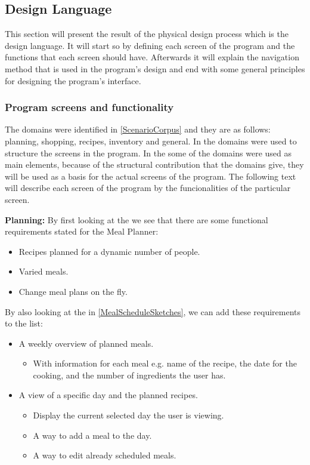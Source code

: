 \subsection{Design Language} \label{DesignLanguage}
This section will present the result of the physical design process which is the design language. It will start so by defining each screen of the program and the  functions that each screen should have. Afterwards it will explain the navigation method that is used in the program's design and end with some general principles for designing the program's interface.

\subsubsection{Program screens and functionality} \label{ScreensandFunctionality}
The domains were identified in \cref{ScenarioCorpus} and they are as follows: planning, shopping, recipes, inventory and general. In  the domains were used to structure the screens in the program. In the  some of the domains were used as main elements, because of the structural contribution that the domains give, they will be used as a basis for the actual screens of the program. The following text will describe each screen of the program by the funcionalities of the particular screen.

\textbf{Planning:}
By first looking at the  we see that there are some functional requirements stated for the Meal Planner:

\begin{itemize}
\item Recipes planned for a dynamic number of people.
\item Varied meals.
\item Change meal plans on the fly.
\end{itemize}  

By also looking at the  in \cref{MealScheduleSketches}, we can add these requirements to the list:

\begin{itemize}
	\item A weekly overview of planned meals.
		\begin{itemize}
			\item With information for each meal e.g. name of the recipe, the date for the cooking, and the number of ingredients the user has.
		\end{itemize}
	\item A view of a specific day and the planned recipes.
		\begin{itemize}
			\item Display the current selected day the user is viewing.
			\item A way to add a meal to the day.
			\item A way to edit already scheduled meals.
		\end{itemize}  
\end{itemize} 

